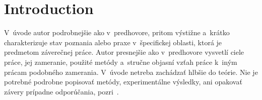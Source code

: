 \setcounter{page}{1}
\setcounter{equation}{0}
\setcounter{figure}{0}
\setcounter{table}{0}

\section*{Introduction}
V~úvode autor podrobnejšie ako v~predhovore, pritom výstižne a~krátko
charakterizuje stav poznania alebo praxe v~špecifickej oblasti, ktorá
je predmetom záverečnej práce. Autor presnejšie ako v~predhovore
vysvetlí ciele práce, jej zameranie, použité metódy a~stručne objasní
vzťah práce k~iným prácam podobného zamerania. V~úvode netreba
zachádzať hlbšie do teórie. Nie je potrebné podrobne popisovať metódy,
experimentálne výsledky, ani opakovať závery prípadne odporúčania,
pozri~\citep{kat}.